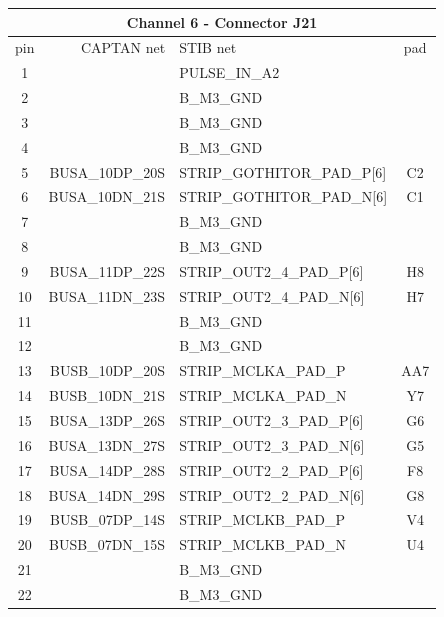 \documentclass[11pt]{article}
\begin{document}
\begin{table}
\begin{center}
\scriptsize
\begin{tabular}{|c|r|l|c|} \hline
\multicolumn{4}{|c|}{Channel 6 - Connector J21} \\ \hline
pin & CAPTAN net & STIB net & pad \\ \hline\hline
 1 &                   & PULSE\_IN\_A2              &    \\
 2 &                   & B\_M3\_GND                 &    \\ \hline
 3 &                   & B\_M3\_GND                 &    \\
 4 &                   & B\_M3\_GND                 &    \\ \hline
 5 &   BUSA\_10DP\_20S & STRIP\_GOTHITOR\_PAD\_P[6] & C2 \\
 6 &   BUSA\_10DN\_21S & STRIP\_GOTHITOR\_PAD\_N[6] & C1 \\ \hline
 7 &                   & B\_M3\_GND                 &    \\
 8 &                   & B\_M3\_GND                 &    \\ \hline
 9 &   BUSA\_11DP\_22S & STRIP\_OUT2\_4\_PAD\_P[6]  & H8 \\
10 &   BUSA\_11DN\_23S & STRIP\_OUT2\_4\_PAD\_N[6]  & H7 \\ \hline
11 &                   & B\_M3\_GND                 &    \\
12 &                   & B\_M3\_GND                 &    \\ \hline
13 &   BUSB\_10DP\_20S & STRIP\_MCLKA\_PAD\_P       & AA7 \\
14 &   BUSB\_10DN\_21S & STRIP\_MCLKA\_PAD\_N       & Y7 \\ \hline
15 &   BUSA\_13DP\_26S & STRIP\_OUT2\_3\_PAD\_P[6]  & G6 \\
16 &   BUSA\_13DN\_27S & STRIP\_OUT2\_3\_PAD\_N[6]  & G5 \\ \hline
17 &   BUSA\_14DP\_28S & STRIP\_OUT2\_2\_PAD\_P[6]  & F8 \\
18 &   BUSA\_14DN\_29S & STRIP\_OUT2\_2\_PAD\_N[6]  & G8 \\ \hline
19 &   BUSB\_07DP\_14S & STRIP\_MCLKB\_PAD\_P       & V4 \\
20 &   BUSB\_07DN\_15S & STRIP\_MCLKB\_PAD\_N       & U4 \\ \hline
21 &                   & B\_M3\_GND                 &    \\
22 &                   & B\_M3\_GND                 &    \\ \hline

\end{tabular}
\end{center}
\end{table}
\end{document}
